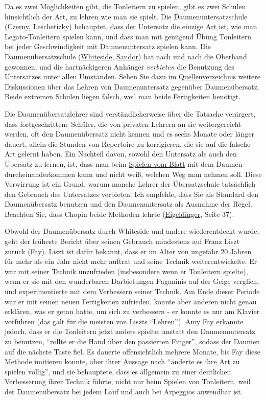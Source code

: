 Da es zwei Möglichkeiten gibt, die Tonleitern zu spielen, gibt es zwei Schulen hinsichtlich der Art, zu lehren wie man sie spielt.
Die Daumenuntersatzschule (Czerny, Leschetizky) behauptet, dass der Untersatz die einzige Art ist, wie man Legato-Tonleitern spielen kann, und dass man mit genügend Übung Tonleitern bei jeder Geschwindigkeit mit Daumenuntersatz spielen kann.
Die Daumenübersatzschule (\hyperref[Whiteside]{Whiteside}, \hyperref[Sandor]{Sandor}) hat nach und nach die Oberhand gewonnen, und die hartnäckigeren Anhänger \textit{verbieten} die Benutzung des Untersatzes unter allen Umständen.
Sehen Sie dazu im \hyperref[reference]{Quellenverzeichnis} weitere Diskussionen über das Lehren von Daumenuntersatz gegenüber Daumenübersatz.
Beide extremen Schulen liegen falsch, weil man beide Fertigkeiten benötigt.

Die Daumenübersatzlehrer sind verständlicherweise über die Tatsache verärgert, dass fortgeschrittene Schüler, die von privaten Lehrern an sie weitergereicht werden, oft den Daumenübersatz nicht kennen und es sechs Monate oder länger dauert, allein die Stunden von Repertoire zu korrigieren, die sie auf die falsche Art gelernt haben.
Ein Nachteil davon, sowohl den Untersatz als auch den Übersatz zu lernen, ist, dass man beim \hyperref[c1iii11]{Spielen vom Blatt} mit dem Daumen durcheinanderkommen kann und nicht weiß, welchen Weg man nehmen soll.
Diese Verwirrung ist ein Grund, warum manche Lehrer der Übersatzschule tatsächlich den Gebrauch des Untersatzes verbieten.
Ich empfehle, dass Sie als Standard den Daumenübersatz benutzen und den Daumenuntersatz als Ausnahme der Regel.
Beachten Sie, dass Chopin beide Methoden lehrte (\hyperref[Eigeldinger]{Eigeldinger}, Seite 37).

Obwohl der Daumenübersatz durch Whiteside und andere wiederentdeckt wurde, geht der früheste Bericht über seinen Gebrauch mindestens auf Franz Liszt zurück (Fay).
Liszt ist dafür bekannt, dass er im Alter von ungefähr 20 Jahren für mehr als ein Jahr nicht mehr auftrat und seine Technik weiterentwickelte.
Er war mit seiner Technik unzufrieden (insbesondere wenn er Tonleitern spielte), wenn er sie mit den wunderbaren Darbietungen Paganinis auf der Geige verglich, und experimentierte mit dem Verbessern seiner Technik.
Am Ende dieser Periode war er mit seinen neuen Fertigkeiten zufrieden, konnte aber anderen nicht genau erklären, was er getan hatte, um sich zu verbessern - er konnte es nur am Klavier vorführen (das galt für die meisten von Liszts \enquote{Lehren}).
Amy Fay erkannte jedoch, dass er die Tonleitern jetzt anders spielte; anstatt den Daumenuntersatz zu benutzen, \enquote{rollte er die Hand über den passierten Finger}, sodass der Daumen auf die nächste Taste fiel.
Es dauerte offensichtlich mehrere Monate, bis Fay diese Methode imitieren konnte, aber ihrer Aussage nach \enquote{änderte es ihre Art zu spielen völlig}, und sie behauptete, dass es allgemein zu einer deutlichen Verbesserung ihrer Technik führte, nicht nur beim Spielen von Tonleitern, weil der Daumenübersatz bei jedem Lauf und auch bei Arpeggios anwendbar ist.


